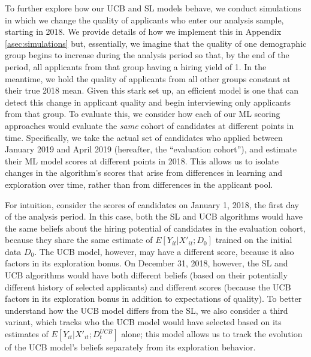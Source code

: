 \documentclass[crop,noquery,editorname,historyrev,nosurname,runningno,sepcount]{RESTUD}
\begin{document}
To further explore how our UCB and SL models behave, we conduct simulations in which we change the quality of applicants who enter our analysis sample, starting in 2018.  We provide details of how we implement this in Appendix \ref{asec:simulations} but, essentially, we imagine that the quality of one demographic group begins to increase during the analysis period so that, by the end of the period, all applicants from that group having a hiring yield of 1.  In the meantime, we hold the quality of applicants from all other groups constant at their true 2018 mean. Given this stark set up, an efficient model is one that can detect this change in applicant quality and begin interviewing only applicants from that group.  To evaluate this, we consider how each of our ML scoring approaches would evaluate the \textit{same} cohort of candidates at different points in time.  Specifically, we take the actual set of candidates who applied between January 2019 and April 2019 (hereafter, the ``evaluation cohort''), and estimate their ML model scores at different points in 2018.  This allows us to isolate changes in the algorithm's scores that arise from differences in learning and exploration over time, rather than from differences in the applicant pool.  

For intuition, consider the scores of candidates on January 1, 2018, the first day of the analysis period.  In this case, both the SL and UCB algorithms would have the same beliefs about the hiring potential of candidates in the evaluation cohort, because they share the same estimate of $E[Y_{it}|X'_{it}; D_0]$ trained on the initial data $D_0$. The UCB model, however, may have a different score, because it also factors in its exploration bonus.  On December 31, 2018, however, the SL and UCB algorithms would have both different beliefs (based on their potentially different history of selected applicants) and different scores (because the UCB factors in its exploration bonus in addition to expectations of quality).  To better understand how the UCB model differs from the SL, we also consider a third variant, which tracks who the UCB model would have selected based on its estimates of $E[Y_{it}|X'_{it}; D^{UCB}_t]$ alone; this model allows us to track the evolution of the UCB model's beliefs separately from its exploration behavior.  
\end{document}
